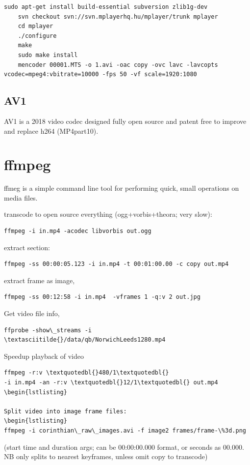 \documentclass[oneside,english]{scrbook}
\begin{document}
\begin{lstlisting}
sudo apt-get install build-essential subversion zlib1g-dev
	svn checkout svn://svn.mplayerhq.hu/mplayer/trunk mplayer
	cd mplayer
	./configure
	make
	sudo make install
	mencoder 00001.MTS -o 1.avi -oac copy -ovc lavc -lavcopts vcodec=mpeg4:vbitrate=10000 -fps 50 -vf scale=1920:1080
\end{lstlisting}

\section{AV1}
AV1 is a 2018 video codec designed fully open source and patent free to improve and replace h264 (MP4part10).

\chapter{ffmpeg}

ffmeg is a simple command line tool for performing quick, small operations on media files.

transcode to open source everything (ogg+vorbis+theora; very slow):
\begin{lstlisting}
ffmpeg -i in.mp4 -acodec libvorbis out.ogg
\end{lstlisting}

extract section: 
\begin{lstlisting}
ffmpeg -ss 00:00:05.123 -i in.mp4 -t 00:01:00.00 -c copy out.mp4 
\end{lstlisting}

extract frame as image,
\begin{lstlisting}
ffmpeg -ss 00:12:58 -i in.mp4  -vframes 1 -q:v 2 out.jpg
\end{lstlisting}

Get video file info,
\begin{lstlisting}
ffprobe -show\_streams -i \textasciitilde{}/data/qb/NorwichLeeds1280.mp4
\end{lstlisting}

Speedup playback of video 
\begin{lstlisting}
ffmpeg -r:v \textquotedbl{}480/1\textquotedbl{}
-i in.mp4 -an -r:v \textquotedbl{}12/1\textquotedbl{} out.mp4
\begin{lstlisting}

Split video into image frame files: 
\begin{lstlisting}
ffmpeg -i corinthian\_raw\_images.avi -f image2 frames/frame-\%3d.png 
\end{lstlisting}
(start time and duration args; can be 00:00:00.000 format, or seconds as 00.000. NB only splits to nearest keyframes, unless omit copy to transcode)
\end{document}
